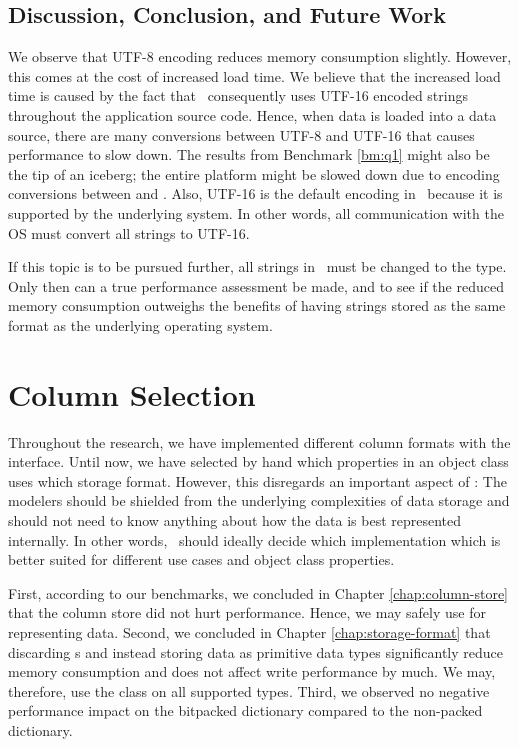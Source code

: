 \subsection{Discussion, Conclusion, and Future Work}
\label{sub:Discussion, Conclusion, and Future Work}
We observe that UTF-8 encoding reduces memory consumption slightly. However, this comes at the cost of increased load time. We believe that the increased load time is caused by the fact that \gap~consequently uses UTF-16 encoded strings throughout the application source code. Hence, when data is loaded into a data source, there are many conversions between UTF-8 and UTF-16 that causes performance to slow down. The results from Benchmark \ref{bm:q1} might also be the tip of an iceberg; the entire platform might be slowed down due to encoding conversions between  and . Also, UTF-16 is the default encoding in \delphi~because it is supported by the underlying system. In other words, all communication with the OS must convert all strings to UTF-16. 

If this topic is to be pursued further, all strings in \gap~must be changed to the  type. Only then can a true performance assessment be made, and to see if the reduced memory consumption outweighs the benefits of having strings stored as the same format as the underlying operating system.

\section{Column Selection}
\label{sec:Column Selection}
Throughout the research, we have implemented different column formats with the  interface. Until now, we have selected by hand which properties in an object class uses which storage format. However, this disregards an important aspect of \mdd: The modelers should be shielded from the underlying complexities of data storage and should not need to know anything about how the data is best represented internally. In other words, \gap~should ideally decide which  implementation which is better suited for different use cases and object class properties.

First, according to our benchmarks, we concluded in Chapter \ref{chap:column-store} that the column store did not hurt performance. Hence, we may safely use  for representing data. Second, we concluded in Chapter \ref{chap:storage-format} that discarding s and instead storing data as primitive data types significantly reduce memory consumption and does not affect write performance by much. We may, therefore, use the  class on all supported types. Third, we observed no negative performance impact on the bitpacked dictionary compared to the non-packed dictionary. 

